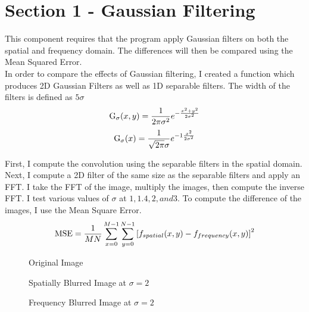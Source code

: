 \documentclass[10pt]{report}
\begin{document}
\section*{Section 1 - Gaussian Filtering}
This component requires that the program apply Gaussian filters on both the 
spatial and frequency domain. The differences will then be compared using
the Mean Squared Error.\\

In order to compare the effects of Gaussian filtering, I created a function which
produces 2D Gaussian Filters as well as 1D separable filters. The width of the 
filters is defined as $5\sigma$\\

\begin{equation}
\textup{G}_{\sigma}(x,y) = \frac{1}{2\pi\sigma^2}{\Large e}^{-\frac{x^2 + y^2}{2\sigma^2}}
\end{equation}
\begin{equation}
\textup{G}_{\sigma}(x) = \frac{1}{\sqrt{2\pi}\sigma}{\Large e}^{-1\frac{x^2}{2\sigma^2}}
\end{equation}

First, I compute the convolution using the separable filters in the spatial domain. Next, 
I compute a 2D filter of the same size as the separable filters and apply an FFT. I take the
FFT of the image, multiply the images, then compute the inverse FFT. I test various values of
$\sigma$ at $1, 1.4, 2, and 3$. To compute the difference of the images, I use the Mean Square Error.\\

\begin{equation}
\textup{MSE} = \frac{1}{MN}\sum_{x=0}^{M-1}\sum_{y=0}^{N-1}\left [ f_{\small{spatial}}(x,y)-f_{\small{frequency}}(x,y)\right ]^2
\end{equation}

\begin{figure}[!h]
\centering
{}
\caption{Original Image}
\end{figure}

\clearpage

\begin{figure}[!h]
\centering
{}
\caption{Spatially Blurred Image at $\sigma = 2$}
\end{figure}
\begin{figure}[!h]
\centering
{}
\caption{Frequency Blurred Image at $\sigma = 2$}
\end{figure}
\end{document}
